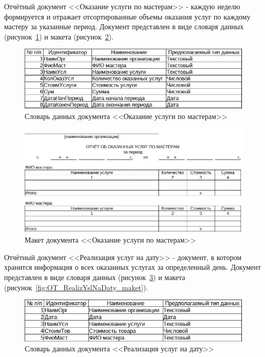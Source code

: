 \documentclass[12pt, a4paper, simple]{eskdtext}
\begin{document}
    Отчётный документ <<Оказание услуги по мастерам>>
    - каждую неделю формируется и отражает отсортированные объемы оказания услуг по каждому мастеру за указанные период.
    Документ представлен в виде словаря данных (рисунок~\ref{fig:OT_OkazYslPoMastery_tipi})
    и макета (рисунок~\ref{fig:OT_OkazYslPoMastery_maket}).

    \begin{figure}[!h]
        \centering
        \includegraphics[]
            {_docs/ОТ_ОказУслПоМастеру_типы.jpg}
        \caption{Словарь данных документа <<Оказание услуги по мастерам>>}
        \label{fig:OT_OkazYslPoMastery_tipi}
    \end{figure}

    \begin{figure}[!h]
        \centering
        \includegraphics[width=14cm]
            {_docs/ОТ_ОказУслПоМастеру_макет.jpg}
        \caption{Макет документа <<Оказание услуги по мастерам>>}
        \label{fig:OT_OkazYslPoMastery_maket}
    \end{figure}

    \newpage

    Отчётный документ <<Реализация услуг на дату>>
    - документ, в котором хранится информация о всех оказанных услугах за определенный день.
    Документ представлен в виде словаря данных (рисунок~\ref{fig:OT_RealizYslNaDaty_tipi})
    и макета (рисунок~\ref{fig:OT_RealizYslNaDaty_maket}).

    \begin{figure}[!h]
        \centering
        \includegraphics[]
            {_docs/ОТ_РеализУслНаДату_типы.jpg}
        \caption{Словарь данных документа <<Реализация услуг на дату>>}
        \label{fig:OT_RealizYslNaDaty_tipi}
    \end{figure}
\end{document}
